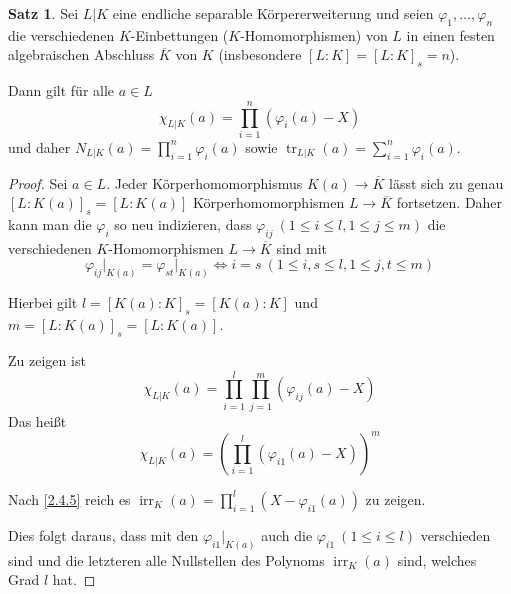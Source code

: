 \documentclass[
twoside=semi,
fontsize=12,
DIV=12, 
cleardoublepage=current,
leqno,
headings=optiontoheadandtoc, 
toc=idx
]{scrbook}
\newcommand{\brac}[1]{\left( #1 \right)}
\DeclareMathOperator{\irr}{irr}
\DeclareMathOperator{\tr}{tr}
\theoremstyle{definition}
\newtheorem{satz}[definition]{Satz}
\begin{document}
	\begin{satz}\label{2.4.6}\hfill\newline
		Sei $L|K$ eine endliche separable K\"orpererweiterung und seien $\varphi_1, \dots, \varphi_n$ die verschiedenen $K$-Einbettungen ($K$-Homomorphismen) von $L$ in einen festen algebraischen Abschluss $\overline{K}$ von $K$ (insbesondere $[L:K] = [L:K]_s = n$).
		
		Dann gilt f\"ur alle $a \in L$
			\[\chi_{L|K}(a) = \prod_{i=1}^n (\varphi_i(a) -X)\]
		und daher $N_{L|K}(a) = \prod_{i=1}^n \varphi_i(a)$ sowie $\tr_{L|K}(a) = \sum_{i=1}^{n}\varphi_i(a)$.
		
		\begin{proof}
			Sei $a \in L$. Jeder K\"orperhomomorphismus $K(a) \to \overline{K}$ l\"asst sich zu genau \linebreak $[L:K(a)]_s = [L:K(a)]$ K\"orperhomomorphismen $L \to \overline{K}$ fortsetzen.
			Daher kann man die $\varphi_i$ so neu indizieren, dass $\varphi_{ij}\ (1 \leq i \leq l, 1 \leq j \leq m)$ die verschiedenen \linebreak $K$-Homomorphismen $L \to \overline{K}$ sind mit \[\varphi_{ij}\big|_{K(a)} = \varphi_{st}\big|_{K(a)} \Leftrightarrow i = s\ (1 \leq i,s\leq l, 1 \leq j, t \leq m)\]
			
			Hierbei gilt $l = [K(a):K]_s = [K(a):K]$ und 
			$m = [L:K(a)]_s = [L:K(a)]$.
			
			Zu zeigen ist 
				\[\chi_{L|K}(a) = \prod_{i=1}^{l}\prod_{j=1}^m(\varphi_{ij}(a)-X)\]
			Das hei\ss t
				\[\chi_{L|K}(a) = \brac{\prod_{i=1}^{l}(\varphi_{i1}(a)-X)}^m\]
				
			Nach \ref{2.4.5} reich es $\irr_K(a) = \prod_{i=1}^l (X-\varphi_{i1}(a))$ zu zeigen.
			
			Dies folgt daraus, dass mit den $\varphi_{i1}\big|_{K(a)}$ auch die $\varphi_{i1}\ (1\leq i \leq l)$ verschieden sind und die letzteren alle Nullstellen des Polynoms $\irr_K(a)$ sind, welches Grad $l$ hat.
		\end{proof}
	\end{satz}
	
\end{document}
